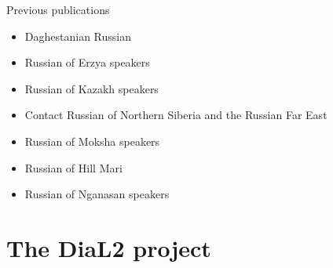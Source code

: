 \documentclass[
  ignorenonframetext,
  t]{beamer}
\providecommand{\tightlist}{%
  \setlength{\itemsep}{0pt}\setlength{\parskip}{0pt}}\usepackage{longtable,booktabs,array}
\begin{document}
\begin{frame}{Previous publications}
\label{previous-publications}
\begin{itemize}
\tightlist
\item
  Daghestanian Russian \citep{daniel10, panova21}
\item
  Russian of Erzya speakers \citep{shagal16}
\item
  Russian of Kazakh speakers \citep{rakhilina18}
\item
  Contact Russian of Northern Siberia and the Russian Far East
  \citep{stoynova19, stoynova21}
\item
  Russian of Moksha speakers \citep{kashkin20}
\item
  Russian of Hill Mari \citep{kashkin22}
\item
  Russian of Nganasan speakers \citep{khomchenkova20}
\end{itemize}
\end{frame}

\section{The DiaL2 project}\label{the-dial2-project}
\end{document}
